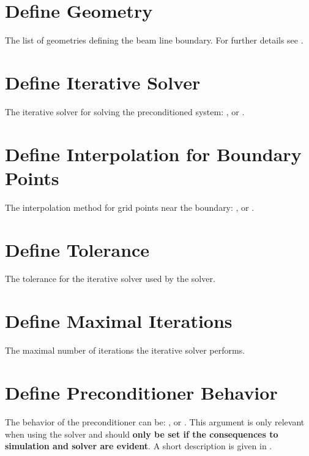 \section{Define Geometry}
\label{sec:GEOMETRY}
The list of geometries defining the beam line boundary. For further details see .

\section{Define Iterative Solver}
\label{sec:ITSOLVER}
The iterative solver for solving the preconditioned system: ,  or .

\section{Define Interpolation for Boundary Points}
\label{sec:INTERPL}
The interpolation method for grid points near the boundary: ,  or .

\section{Define Tolerance}
\label{sec:TOL}
The tolerance for the iterative solver used by the  solver.

\section{Define Maximal Iterations}
\label{sec:MAXITERS}
The maximal number of iterations the iterative solver performs.

\section{Define Preconditioner Behavior}
\label{sec:PRECMODE}
The behavior of the preconditioner can be: ,  or . This argument is only relevant when using the  solver and should \textbf{only be set if the consequences to simulation and solver are evident}. A short description is given in .

